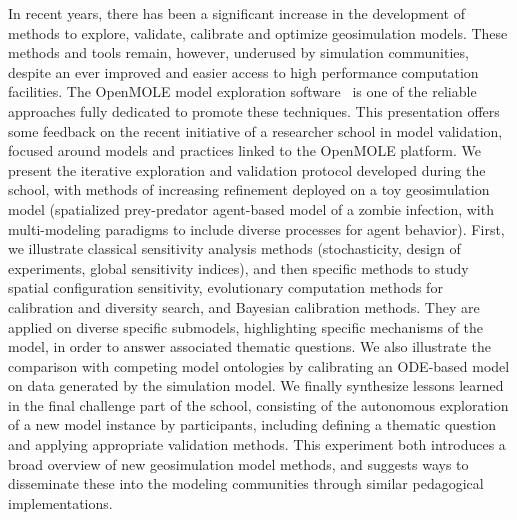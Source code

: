 \documentclass[11pt]{article}
\begin{document}
In recent years, there has been a significant increase in the development of methods to explore, validate, calibrate and optimize geosimulation models. These methods and tools remain, however, underused by simulation communities, despite an ever improved and easier access to high performance computation facilities. The OpenMOLE model exploration software~\citep{reuillon2013openmole} is one of the reliable approaches fully dedicated to promote these techniques. This presentation offers some feedback on the recent initiative of a researcher school in model validation, focused around models and practices linked to the OpenMOLE platform. We present the iterative exploration and validation protocol developed during the school, with methods of increasing refinement deployed on a toy geosimulation model (spatialized prey-predator agent-based model of a zombie infection, with multi-modeling paradigms to include diverse processes for agent behavior). First, we illustrate classical sensitivity analysis methods (stochasticity, design of experiments, global sensitivity indices), and then specific methods to study spatial configuration sensitivity, evolutionary computation methods for calibration and diversity search, and Bayesian calibration methods. They are applied on diverse specific submodels, highlighting specific mechanisms of the model, in order to answer associated thematic questions. We also illustrate the comparison with competing model ontologies by calibrating an ODE-based model on data generated by the simulation model. We finally synthesize lessons learned in the final challenge part of the school, consisting of the autonomous exploration of a new model instance by participants, including defining a thematic question and applying appropriate validation methods. This experiment both introduces a broad overview of new geosimulation model methods, and suggests ways to disseminate these into the modeling communities through similar pedagogical implementations.











\end{document}
